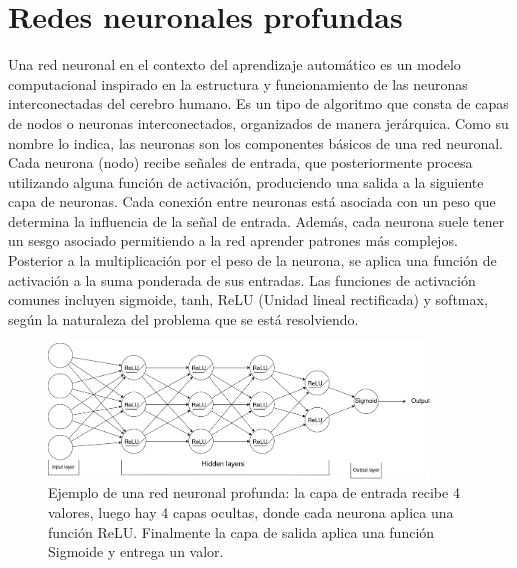 \documentclass[12pt,letterpaper,final, openany]{scrbook}
\begin{document}
\section{Redes neuronales profundas}

Una red neuronal en el contexto del aprendizaje automático es un modelo computacional inspirado en la estructura y funcionamiento de las neuronas interconectadas del cerebro humano. Es un tipo de algoritmo que consta de capas de nodos o neuronas interconectados, organizados de manera jerárquica. Como su nombre lo indica, las neuronas son los componentes básicos de una red neuronal. Cada neurona (nodo) recibe señales de entrada, que posteriormente procesa utilizando alguna función de activación, produciendo una salida a la siguiente capa de neuronas. Cada conexión entre neuronas está asociada con un peso que determina la influencia de la señal de entrada. Además, cada neurona suele tener un sesgo asociado permitiendo a la red aprender patrones más complejos. Posterior a la multiplicación por el peso de la neurona, se aplica una función de activación a la suma ponderada de sus entradas. Las funciones de activación comunes incluyen sigmoide, tanh, ReLU (Unidad lineal rectificada) y softmax, según la naturaleza del problema que se está resolviendo.
\begin{figure}[h!]
    \centering
    \includegraphics[width=0.9\textwidth]{neural_nets.drawio.png}
    \caption{Ejemplo de una red neuronal profunda: la capa de entrada recibe 4 valores, luego hay 4 capas ocultas, donde cada neurona aplica una función ReLU. Finalmente la capa de salida aplica una función Sigmoide y entrega un valor.}
    \label{fig:deep_nets}
\end{figure}
\end{document}
